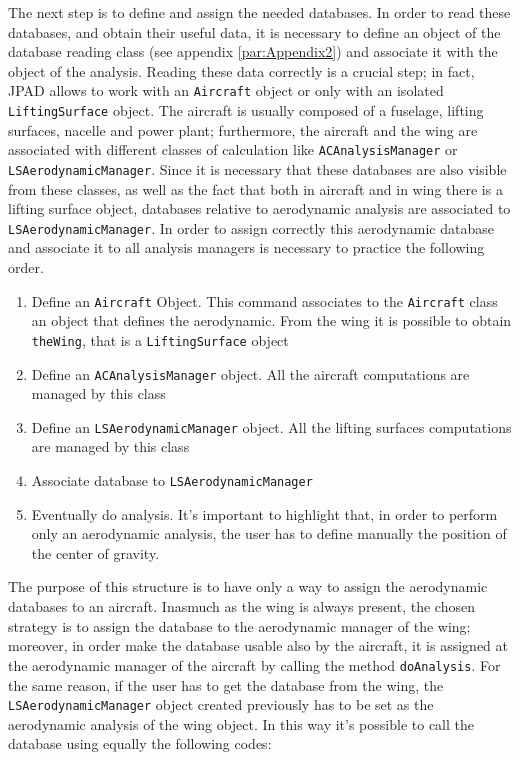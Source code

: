 \bigskip
\noindent
The next step is to define and assign the needed databases. In order to read these databases, and obtain their useful data, it is necessary to define an object
of the database reading class (see appendix \ref{par:Appendix2}) and associate it with the object of the analysis. Reading these data correctly is a crucial step; in fact, \gls{JPAD} allows to work with an \lstinline[language=Java]!Aircraft! object or only with an isolated \lstinline[language=Java]!LiftingSurface! object. The aircraft is usually composed of a fuselage, lifting surfaces, nacelle and power plant; furthermore, the aircraft and the wing are associated with different classes of calculation like \lstinline[language=Java]!ACAnalysisManager! or \lstinline[language=Java]!LSAerodynamicManager!. Since it is necessary that these databases are also visible from these classes, as well as the fact that both in aircraft and in wing there is a lifting surface object, databases relative to aerodynamic analysis are associated to \lstinline[language=Java]!LSAerodynamicManager!. 
%
In order to assign correctly this aerodynamic database and associate it to all analysis managers is necessary to practice the following order.
\begin{enumerate}
\item Define an \lstinline[language=Java]!Aircraft! Object. This command associates to the \lstinline[language=Java]!Aircraft! class an object that defines the aerodynamic. From the wing it is possible to obtain \lstinline[language=Java]!theWing!, that is a \lstinline[language=Java]!LiftingSurface! object
\item Define an \lstinline[language=Java]!ACAnalysisManager! object. All the aircraft computations are managed by this class
\item Define an \lstinline[language=Java]!LSAerodynamicManager! object. All the lifting surfaces computations are managed by this class
\item Associate database to \lstinline[language=Java]!LSAerodynamicManager!
\item Eventually do analysis. It's important to highlight that, in order to perform only an aerodynamic analysis, the user has to define manually the position of the center of gravity.
\end{enumerate} 
%
The purpose of this structure is to have only a way to assign the aerodynamic databases to an aircraft. Inasmuch as the wing is always present, the chosen strategy is to assign the database to the aerodynamic manager of the wing; moreover, in order make the database usable also by the aircraft, it is assigned at the aerodynamic manager of the aircraft by calling the method \lstinline[language=Java]!doAnalysis!. For the same reason, if the user has to get the database from the wing, the \lstinline[language=Java]!LSAerodynamicManager! object created previously has to be set as the aerodynamic analysis of the wing object. In this way it's possible to call the database using equally the following codes:
